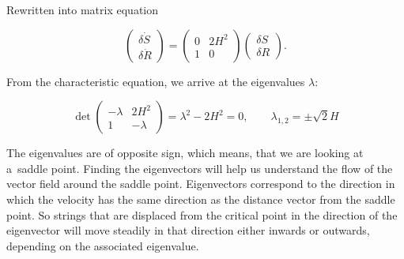 \noindent
Rewritten into matrix equation

\begin{equation}
    \begin{pmatrix}
        \delta \dot{S} \\ \delta \dot{R}
    \end{pmatrix}
    =
    \begin{pmatrix}
        0 & 2H^2 \\
        1 & 0
    \end{pmatrix}
    \begin{pmatrix}
        \delta S \\ \delta R
    \end{pmatrix}.
\end{equation}

\noindent
From the characteristic equation, we arrive at the eigenvalues $\lambda$:

\begin{equation}
    \det 
    \begin{pmatrix}
        -\lambda & 2H^2 \\
        1 & -\lambda
    \end{pmatrix} = \lambda^2 - 2H^2 = 0, \qquad \lambda_{1,2} = \pm \sqrt{2} H
\end{equation}

\noindent
The eigenvalues are of opposite sign, which means, that we are looking at a~saddle point. Finding the eigenvectors will help us understand the flow of the vector field around the saddle point. Eigenvectors correspond to the direction in which the velocity has the same direction as the distance vector from the saddle point. So strings that are displaced from the critical point in the direction of the eigenvector will move steadily in that direction either inwards or outwards, depending on the associated eigenvalue.

